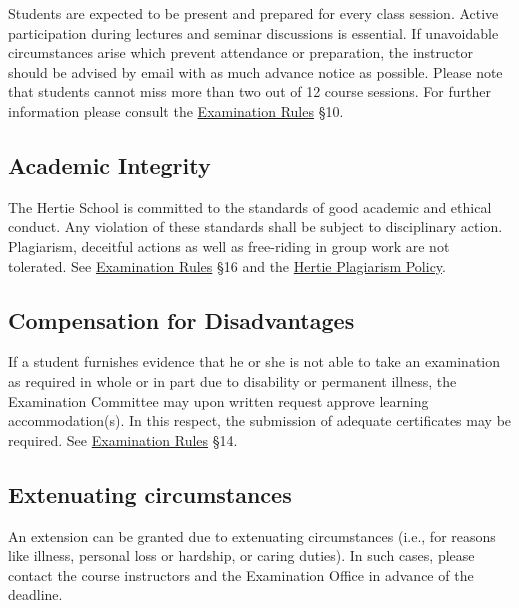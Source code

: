 \documentclass[
]{article}
\begin{document}
Students are expected to be present and prepared for every class
session. Active participation during lectures and seminar discussions is
essential. If unavoidable circumstances arise which prevent attendance
or preparation, the instructor should be advised by email with as much
advance notice as possible. Please note that students cannot miss more
than two out of 12 course sessions. For further information please
consult the
\href{https://moodle.hertie-school.org/mod/book/view.php?id=47912}{Examination
Rules} §10.

\hypertarget{academic-integrity}{%
\subsection{Academic Integrity}\label{academic-integrity}}

The Hertie School is committed to the standards of good academic and
ethical conduct. Any violation of these standards shall be subject to
disciplinary action. Plagiarism, deceitful actions as well as
free-riding in group work are not tolerated. See
\href{https://moodle.hertie-school.org/mod/book/view.php?id=47912}{Examination
Rules} §16 and the
\href{https://moodle.hertie-school.org/mod/page/view.php?id=66059}{Hertie
Plagiarism Policy}.

\hypertarget{compensation-for-disadvantages}{%
\subsection{Compensation for
Disadvantages}\label{compensation-for-disadvantages}}

If a student furnishes evidence that he or she is not able to take an
examination as required in whole or in part due to disability or
permanent illness, the Examination Committee may upon written request
approve learning accommodation(s). In this respect, the submission of
adequate certificates may be required. See
\href{https://moodle.hertie-school.org/mod/book/view.php?id=47912}{Examination
Rules} §14.

\hypertarget{extenuating-circumstances}{%
\subsection{Extenuating circumstances}\label{extenuating-circumstances}}

An extension can be granted due to extenuating circumstances (i.e., for
reasons like illness, personal loss or hardship, or caring duties). In
such cases, please contact the course instructors and the Examination
Office in advance of the deadline.
\end{document}
